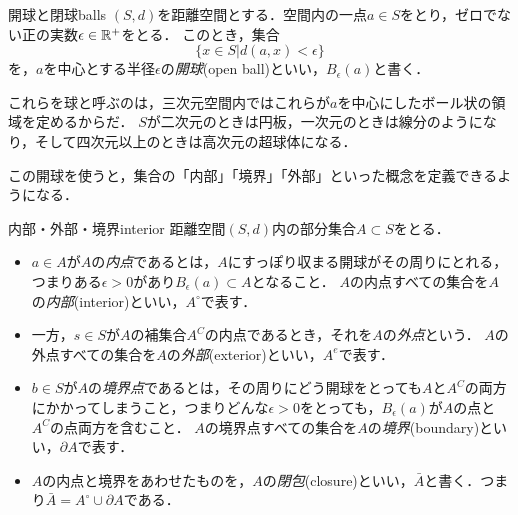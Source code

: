 \documentclass[11pt,a4paper, dvipdfmx]{jsarticle}
\begin{document}
\begin{dfn}{開球と閉球}{balls}
 $(S, d)$を距離空間とする．空間内の一点$a \in S$をとり，ゼロでない正の実数$\epsilon \in \mathbb{R}^+$をとる．
このとき，集合
\[
  \{ x \in S | d(a, x) < \epsilon \}
\]
を，$a$を中心とする半径$\epsilon$の\emph{開球}(open ball)といい，$B_\epsilon(a)$と書く．%
\end{dfn}
これらを球と呼ぶのは，三次元空間内ではこれらが$a$を中心にしたボール状の領域を定めるからだ．
$S$が二次元のときは円板，一次元のときは線分のようになり，そして四次元以上のときは高次元の超球体になる．

この開球を使うと，集合の「内部」「境界」「外部」といった概念を定義できるようになる．
\begin{dfn}{内部・外部・境界}{interior}
  距離空間$(S, d)$内の部分集合$A \subset S$をとる．
  \begin{itemize}
    \item $a \in A$が$A$の\emph{内点}であるとは，$A$にすっぽり収まる開球がその周りにとれる，つまりある$\epsilon > 0$があり$B_\epsilon(a) \subset A$となること．
    $A$の内点すべての集合を$A$の\emph{内部}(interior)といい，$A^\circ$で表す．
    \item 一方，$s \in S$が$A$の補集合$A^C$の内点であるとき，それを$A$の\emph{外点}という．
    $A$の外点すべての集合を$A$の\emph{外部}(exterior)といい，$A^e$で表す．
    \item $b \in S$が$A$の\emph{境界点}であるとは，その周りにどう開球をとっても$A$と$A^C$の両方にかかってしまうこと，つまりどんな$\epsilon > 0$をとっても，$B_\epsilon(a)$が$A$の点と$A^C$の点両方を含むこと．
    $A$の境界点すべての集合を$A$の\emph{境界}(boundary)といい，$\partial A$で表す．
    \item $A$の内点と境界をあわせたものを，$A$の\emph{閉包}(closure)といい，$\bar{A}$と書く．つまり$\bar{A} = A^\circ \cup \partial A$である．
  \end{itemize}
\end{dfn}

\end{document}
